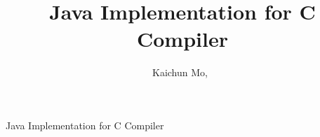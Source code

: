 \documentclass[journal]{IEEEtran}
\begin{document}
%
\title{Java Implementation for C Compiler}
%
%
%

\author{Kaichun Mo,~}

% 
%



%
{Java Implementation for C Compiler}
% 




\end{document}
